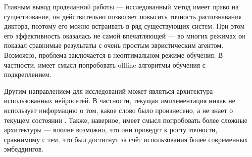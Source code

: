 Главным вывод проделанной работы --- исследованный метод имеет право на
существование, он действительно позволяет повысить точность распознавания
диктора, поэтому его можно встраивать в ряд существующих систем. При этом
его эффективность оказалась не самой впечатляющей --- во многих режимах он
показал сравнимые результаты с очень простым эвристическим агентом. Возможно,
проблема заключается в неоптимальном режиме обучения. В частности, имеет смысл
попробовать offline алгоритмы обучения с подкреплением.

Другим направлением для исследований может являться архитектура использованных
нейросетей. В частности, текущая имплементация \guesser{} никак не использует
информацию о том, какое слово было произнесено, а \enquirer{} не знает о
текущем состоянии \guesser{}. Также, наверное, имеет смысл попробовать более
сложные архитектуры --- вполне возможно, что они приведут к росту точности,
сравнимому с тем, что был достигнут за счёт использования более современных
эмбеддингов.